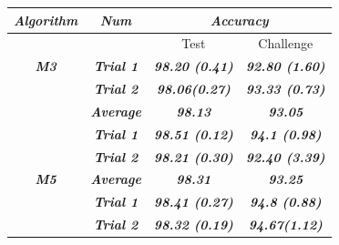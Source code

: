 \documentclass{article}
\begin{document}
\begin{table}[]
\begin{tabular}{|c|c|cc|}
\hline
\textit{\textbf{Algorithm}}                     & \textit{\textbf{Num}}     & \multicolumn{2}{c|}{\textit{\textbf{Accuracy}}}                                                                      \\ \hline
\multicolumn{1}{|l|}{}                          & \multicolumn{1}{l|}{}     & \multicolumn{1}{c|}{Test}                                           & Challenge                                      \\ \hline
\textit{\textbf{M3}}                            & \textit{\textbf{Trial 1}} & \multicolumn{1}{c|}{\textit{\textbf{98.20 (0.41)}}}                 & \textit{\textbf{92.80 (1.60)}}                 \\ \cline{2-4} 
\textit{\textbf{}}                              & \textit{\textbf{Trial 2}} & \multicolumn{1}{c|}{\textit{\textbf{98.06(0.27)}}}                  & \textit{\textbf{93.33 (0.73)}}                 \\ \cline{2-4} 
\textit{\textbf{}}                              & \textit{\textbf{Average}} & \multicolumn{1}{c|}{\textit{\textbf{98.13}}}                        & \textit{\textbf{93.05}}                        \\ \hline
                                                & \textit{\textbf{Trial 1}} & \multicolumn{1}{c|}{\textit{\textbf{98.51 (0.12)}}}                 & \textit{\textbf{94.1 (0.98)}}                  \\ \cline{2-4} 
                                                & \textit{\textbf{Trial 2}} & \multicolumn{1}{c|}{\textit{\textbf{98.21 (0.30)}}}                 & \textit{\textbf{92.40 (3.39)}}                 \\ \cline{2-4} 
\multirow{-3}{*}{\textit{\textbf{M5}}}          & \textit{\textbf{Average}} & \multicolumn{1}{c|}{\textit{\textbf{98.31}}}                        & \textit{\textbf{93.25}}                        \\ \hline
                                                & \textit{\textbf{Trial 1}} & \multicolumn{1}{c|}{\textit{\textbf{98.41 (0.27)}}}                 & \textit{\textbf{94.8 (0.88)}}                  \\ \cline{2-4} 
                                                & \textit{\textbf{Trial 2}} & \multicolumn{1}{c|}{\textit{\textbf{98.32 (0.19)}}}                 & \textit{\textbf{94.67(1.12)}}                  \\ \cline{2-4} 

\end{tabular}
\end{table}
\end{document}
